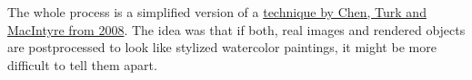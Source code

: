 The whole process is a simplified version of a
\href{http://csnotes.upm.edu.my/kelasmaya/web.nsf/0/d82e709c4661ce464825766400365c4d/\$FILE/p231-chen.pdf}{technique
by Chen, Turk and MacIntyre from 2008}. The idea was that if both, real
images and rendered objects are postprocessed to look like stylized
watercolor paintings, it might be more difficult to tell them apart.
